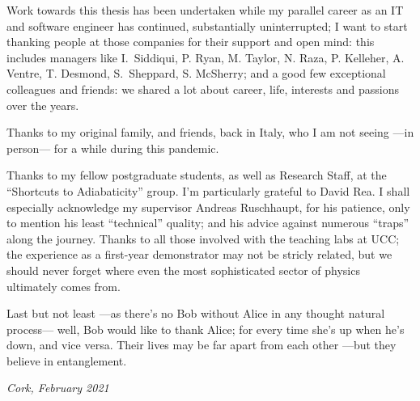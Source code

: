 {
\small
Work towards this thesis has been undertaken while my parallel career
as an IT and software engineer has continued,
substantially uninterrupted;
I want to start thanking people at those companies for their support and open mind:
this includes managers like
I.~Siddiqui, P. Ryan, M. Taylor, N. Raza, P. Kelleher, A. Ventre, T. Desmond, S.~Sheppard, S. McSherry;
and a good few exceptional colleagues and friends:
we shared a lot about career, life, interests and passions over the years.

Thanks to my original family, and friends, back in Italy,
who I am not seeing ---in person--- for a while during this pandemic.

Thanks to my fellow postgraduate students,
as well as Research Staff,
at the ``Shortcuts to Adiabaticity'' group.
I'm particularly grateful to David Rea.
I shall especially acknowledge my supervisor Andreas Ruschhaupt, for his patience,
only to mention his least ``technical'' quality;
and his advice against numerous ``traps'' along the journey.
Thanks to all those involved with the teaching labs at UCC;
the  experience as a  first-year demonstrator may not be stricly related,
but we should never forget where even the most sophisticated sector of physics
ultimately comes from.

Last but not least ---as there's no Bob without Alice in any thought natural process---
well, Bob would like to thank Alice;
for every time she’s up when he’s down, and vice versa.
Their lives may be far apart from each other ---but they believe in entanglement.

\textit{Cork, February 2021}
}
